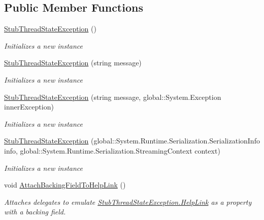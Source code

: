 \subsection*{Public Member Functions}
\begin{DoxyCompactItemize}
\item 
\hyperlink{class_system_1_1_threading_1_1_fakes_1_1_stub_thread_state_exception_a71794c51d0246a6663a855819d07fcf6}{Stub\-Thread\-State\-Exception} ()
\begin{DoxyCompactList}\small\item\em Initializes a new instance\end{DoxyCompactList}\item 
\hyperlink{class_system_1_1_threading_1_1_fakes_1_1_stub_thread_state_exception_a0ba3e7eacf1e345fc15cc1c8a66f9384}{Stub\-Thread\-State\-Exception} (string message)
\begin{DoxyCompactList}\small\item\em Initializes a new instance\end{DoxyCompactList}\item 
\hyperlink{class_system_1_1_threading_1_1_fakes_1_1_stub_thread_state_exception_a69e1e205a80c4cc82fa1a7a8bf06cc09}{Stub\-Thread\-State\-Exception} (string message, global\-::\-System.\-Exception inner\-Exception)
\begin{DoxyCompactList}\small\item\em Initializes a new instance\end{DoxyCompactList}\item 
\hyperlink{class_system_1_1_threading_1_1_fakes_1_1_stub_thread_state_exception_a76d0fb55936478effe2bcafe6adb6936}{Stub\-Thread\-State\-Exception} (global\-::\-System.\-Runtime.\-Serialization.\-Serialization\-Info info, global\-::\-System.\-Runtime.\-Serialization.\-Streaming\-Context context)
\begin{DoxyCompactList}\small\item\em Initializes a new instance\end{DoxyCompactList}\item 
void \hyperlink{class_system_1_1_threading_1_1_fakes_1_1_stub_thread_state_exception_abff5c11975503544a06ee37b788da3c9}{Attach\-Backing\-Field\-To\-Help\-Link} ()
\begin{DoxyCompactList}\small\item\em Attaches delegates to emulate \hyperlink{class_system_1_1_threading_1_1_fakes_1_1_stub_thread_state_exception_adb3ca649adf74a7adcbfc7c8c2edeb3d}{Stub\-Thread\-State\-Exception.\-Help\-Link} as a property with a backing field.\end{DoxyCompactList}\item 

\end{DoxyCompactItemize}
